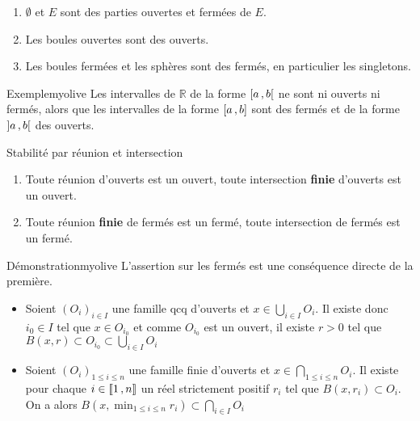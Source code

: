     \begin{prop}{}{}
        \begin{enumerate}
            \item $\emptyset$ et $E$ sont des parties ouvertes et fermées de $E$.
            \item Les boules ouvertes sont des ouverts.
            \item Les boules fermées et les sphères sont des fermés, en particulier les singletons.
        \end{enumerate}
    \end{prop}

    \begin{omed}{Exemple}{myolive}
        Les intervalles de $\mathbb{R}$ de la forme $\left[ a \, , b \right[$ ne sont ni ouverts ni fermés, alors que les intervalles de la forme $\left[ a \, , b \right]$ sont des fermés et de la forme $\left] a \, , b \right[$ des ouverts.
    \end{omed}

    \begin{prop}{Stabilité par réunion et intersection}{}
        \begin{enumerate}
            \item Toute réunion d’ouverts est un ouvert, toute intersection \textbf{finie} d’ouverts est un ouvert.
            \item Toute réunion \textbf{finie} de fermés est un fermé, toute intersection de fermés est un fermé.
        \end{enumerate}
    \end{prop}

    \begin{demo}{Démonstration}{myolive}
        L’assertion sur les fermés est une conséquence directe de la première.
        \begin{itemize}
            \item Soient $(O_i)_{i \in I}$ une famille qcq d’ouverts et $x \in \bigcup\limits_{i \in I} O_i$. Il existe donc $i_0 \in I$ tel que $x \in O_{i_0}$ et comme $O_{i_0}$ est un ouvert, il existe $r > 0$ tel que $B(x,r) \subset O_{i_0} \subset \bigcup\limits_{i \in I} O_i$
            \item Soient $(O_i)_{1 \leq i \leq n}$ une famille finie d’ouverts et $x \in \bigcap\limits_{1 \leq i \leq n} O_i$. Il existe pour chaque $i \in \left\llbracket 1 \, , n \right\rrbracket$ un réel strictement positif $r_i$ tel que $B(x,r_i) \subset O_i$. On a alors $B(x,\min_{1 \leq i \leq n} r_i) \subset \bigcap\limits_{i \in I} O_i$
        \end{itemize}
    \end{demo}

